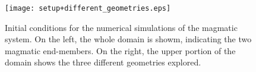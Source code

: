 \documentclass[fleqn,11pt]{article}
\begin{document}
 
\lstset{language=MATLAB,basicstyle=\small\ttfamily}

\title{}
\author{Chiara P. Montagna}
\date{\today}
\maketitle

\setcounter{tocdepth}{2} %
\tableofcontents



\begin{figure}[h]
  \centering
  \texttt{[image: setup+different\_geometries.eps]} %
  \caption{Initial conditions for the numerical simulations of the
    magmatic system. On the left, the whole domain is showm,
    indicating the two magmatic end-members. On the right, the upper
    portion of the domain shows the three different geometries
    explored.}
  \label{setup+different_geometries}
\end{figure}



 
\end{document}
